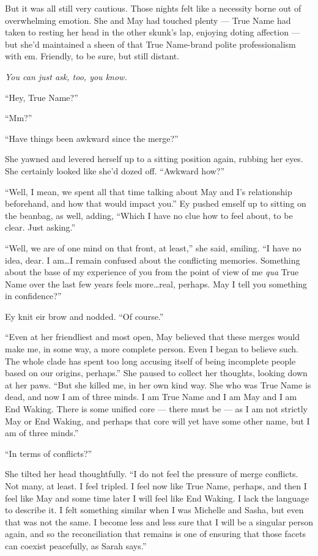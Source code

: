 But it was all still very cautious. Those nights felt like a necessity borne out of overwhelming emotion. She and May had touched plenty — True Name had taken to resting her head in the other skunk's lap, enjoying doting affection — but she'd maintained a sheen of that True Name-brand polite professionalism with em. Friendly, to be sure, but still distant.

\emph{You can just ask, too, you know.}

``Hey, True Name?''

``Mm?''

``Have things been awkward since the merge?''

She yawned and levered herself up to a sitting position again, rubbing her eyes. She certainly looked like she'd dozed off. ``Awkward how?''

``Well, I mean, we spent all that time talking about May and I's relationship beforehand, and how that would impact you.'' Ey pushed emself up to sitting on the beanbag, as well, adding, ``Which I have no clue how to feel about, to be clear. Just asking.''

``Well, we are of one mind on that front, at least,'' she said, smiling. ``I have no idea, dear. I am\ldots I remain confused about the conflicting memories. Something about the base of my experience of you from the point of view of me \emph{qua} True Name over the last few years feels more\ldots real, perhaps. May I tell you something in confidence?''

Ey knit eir brow and nodded. ``Of course.''

``Even at her friendliest and most open, May believed that these merges would make me, in some way, a more complete person. Even I began to believe such. The whole clade has spent too long accusing itself of being incomplete people based on our origins, perhaps.'' She paused to collect her thoughts, looking down at her paws. ``But she killed me, in her own kind way. She who was True Name is dead, and now I am of three minds. I am True Name and I am May and I am End Waking. There is some unified core — there must be — as I am not strictly May or End Waking, and perhaps that core will yet have some other name, but I am of three minds.''

``In terms of conflicts?''

She tilted her head thoughtfully. ``I do not feel the pressure of merge conflicts. Not many, at least. I feel tripled. I feel now like True Name, perhaps, and then I feel like May and some time later I will feel like End Waking. I lack the language to describe it. I felt something similar when I was Michelle and Sasha, but even that was not the same. I become less and less sure that I will be a singular person again, and so the reconciliation that remains is one of ensuring that those facets can coexist peacefully, as Sarah says.''

